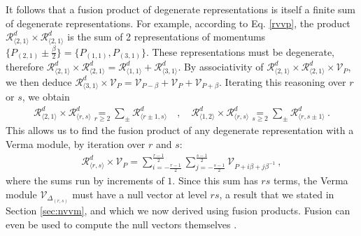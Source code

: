 \documentclass[12pt, a4paper]{article}
\begin{document}
It follows that a fusion product of degenerate representations is itself a finite sum of degenerate representations. 
For example, according to Eq. \eqref{rvvp}, the product $\mathcal{R}^d_{\langle 2,1\rangle}\times\mathcal{R}^d_{\langle 2,1\rangle}$ is the sum of 2 representations of momentums $\{P_{(2,1)} \pm \frac{\beta}{2}\} = \{P_{(1,1)},P_{(3,1)}\}$. These representations must be degenerate, therefore $\mathcal{R}^d_{\langle 2,1\rangle}\times\mathcal{R}^d_{\langle 2,1\rangle}=\mathcal{R}^d_{\langle 1,1\rangle}+\mathcal{R}^d_{\langle 3,1\rangle}$. By associativity of $\mathcal{R}^d_{\langle 2,1\rangle}\times\mathcal{R}^d_{\langle 2,1\rangle}\times \mathcal{V}_P$, we then deduce 
$
 \mathcal{R}^d_{\langle 3,1\rangle} \times \mathcal{V}_P = \mathcal{V}_{P-\beta}+\mathcal{V}_P+\mathcal{V}_{P+\beta}
$. Iterating this reasoning over $r$ or $s$, we obtain 
\begin{align}
 \mathcal{R}^d_{\langle 2,1\rangle}\times \mathcal{R}^d_{\langle r,s\rangle} 
 \underset{r\geq 2}{=} \sum_\pm \mathcal{R}^d_{\langle r\pm 1,s\rangle} 
 \quad , \quad 
 \mathcal{R}^d_{\langle 1,2\rangle}\times \mathcal{R}^d_{\langle r,s\rangle} 
 \underset{s\geq 2}{=}\sum_\pm \mathcal{R}^d_{\langle r,s\pm 1\rangle} \ .
 \label{rrrs}
\end{align}
This allows us to find the fusion product of any degenerate representation with a Verma module, by iteration over $r$ and $s$:
\begin{align}
 \boxed{\mathcal{R}^d_{\langle r,s\rangle}\times \mathcal{V}_P = \sum_{i=-\frac{r-1}{2}}^{\frac{r-1}{2}} \sum_{j=-\frac{s-1}{2}}^{\frac{s-1}{2}} \mathcal{V}_{P+i\beta +j\beta^{-1}}}\ ,
 \label{rrsvp}
\end{align}
where the sums run by increments of $1$. Since this sum has $rs$ terms, the Verma module $\mathcal{V}_{\Delta_{(r,s)}}$ must have a null vector at level $rs$, a result that we stated in Section \ref{sec:nvvm}, and which we now derived using fusion products. Fusion can even be used to compute the null vectors themselves \cite{fms97}. 
\end{document}
